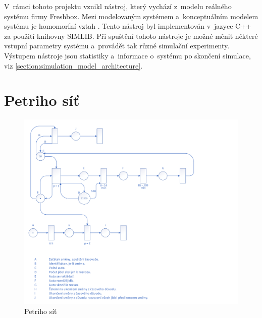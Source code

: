 \documentclass[a4paper, 11pt]{article}
\begin{document}
	V~rámci tohoto projektu vznikl nástroj, který vychází z~modelu reálného
	systému firmy Freshbox. Mezi modelovaným systémem a~konceptuálním
	modelem systému je homomorfní vztah \cite[snímek 28]{IMS_slides}. Tento
	nástroj byl implementován v~jazyce C++ za použití knihovny SIMLIB.
	Při spuštění tohoto nástroje je možné měnit některé vstupní parametry
	systému a~provádět tak různé simulační experimenty. Výstupem nástroje
	jsou statistiky a~informace o~systému po skončení simulace, viz
	\ref{section:simulation_model_architecture}.



	\clearpage
	
	\renewcommand{\refname}{Literatura}
	



	\clearpage
	\appendix


	\section{Petriho síť}
	\label{appendix:petri_net}

	\begin{figure}[ht]
		\centering
		\includegraphics[width=1 \linewidth]{inc/petri_net.pdf}

		\caption{Petriho síť}
	\end{figure}
\end{document}
